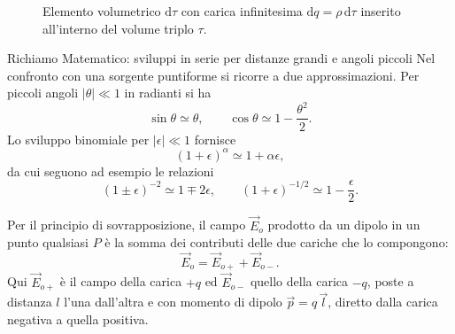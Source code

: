 \documentclass[11pt,a4paper]{article}
\newcommand{\titoletto}[1]{\par\Needspace{4\baselineskip}\medskip\noindent{\large\scshape #1}\par\nopagebreak\smallskip\noindent}
\begin{document}
\begin{figure}[htbp]
  \caption{Elemento volumetrico $\mathrm{d}\tau$ con carica infinitesima $\mathrm{d}q = \rho\,\mathrm{d}\tau$ inserito all'interno del volume triplo $\tau$.}
  \label{fig:distribuzione_volumetrica_infografica}
\end{figure}


\begin{richiamo}{Richiamo Matematico: sviluppi in serie per distanze grandi e angoli piccoli}
Nel confronto con una sorgente puntiforme si ricorre a due approssimazioni. Per piccoli angoli $|\theta|\ll 1$ in radianti si ha
\[
\sin\theta\simeq\theta, \qquad \cos\theta\simeq 1-\frac{\theta^2}{2}.
\]
Lo sviluppo binomiale per $|\epsilon|\ll 1$ fornisce
\[
(1+\epsilon)^{\alpha}\simeq 1+\alpha\epsilon,
\]
da cui seguono ad esempio le relazioni
\[
(1\pm\epsilon)^{-2}\simeq 1\mp 2\epsilon, \qquad (1+\epsilon)^{-1/2}\simeq 1-\frac{\epsilon}{2}.
\]
\end{richiamo}

\titoletto{Il dipolo elettrico}
Per il principio di sovrapposizione, il campo $\vec{E}_{o}$ prodotto da un dipolo in un punto qualsiasi $P$ è la somma dei contributi delle due cariche che lo compongono:
\begin{equation}
	\vec{E}_{o}=\vec{E}_{o+}+\vec{E}_{o-}.
\end{equation}
Qui $\vec{E}_{o+}$ è il campo della carica $+q$ ed $\vec{E}_{o-}$ quello della carica $-q$, poste a distanza $l$ l'una dall'altra e con momento di dipolo $\vec{p}=q\,\vec{l}$, diretto dalla carica negativa a quella positiva.
\end{document}
